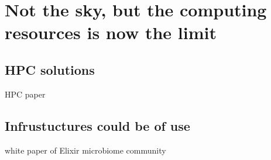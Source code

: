 \chapter{Not the sky, but the computing resources is now the limit}
\label{cha:5}


\section{HPC solutions}

HPC paper


\section{Infrustuctures could be of use}

white paper of Elixir microbiome community 

